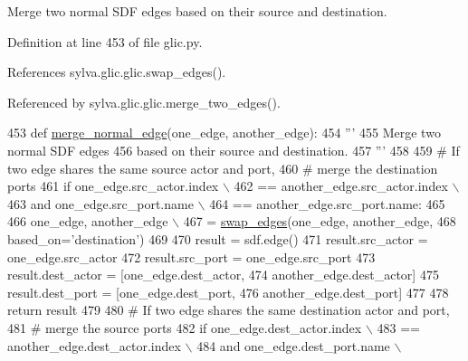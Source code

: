 \begin{DoxyVerb}  Merge two normal SDF edges
  based on their source and destination.
\end{DoxyVerb}
 

Definition at line 453 of file glic.\+py.



References sylva.\+glic.\+glic.\+swap\+\_\+edges().



Referenced by sylva.\+glic.\+glic.\+merge\+\_\+two\+\_\+edges().


\begin{DoxyCode}
453     \textcolor{keyword}{def }\hyperlink{namespacesylva_1_1glic_1_1glic_a1d03fa1322fc331579ff650ea5612ce8}{merge\_normal\_edge}(one\_edge, another\_edge):
454         \textcolor{stringliteral}{'''}
455 \textcolor{stringliteral}{          Merge two normal SDF edges}
456 \textcolor{stringliteral}{          based on their source and destination.}
457 \textcolor{stringliteral}{        '''}
458 
459         \textcolor{comment}{# If two edge shares the same source actor and port,}
460         \textcolor{comment}{# merge the destination ports}
461         \textcolor{keywordflow}{if} one\_edge.src\_actor.index \(\backslash\)
462                 == another\_edge.src\_actor.index \(\backslash\)
463                 \textcolor{keywordflow}{and} one\_edge.src\_port.name \(\backslash\)
464                 == another\_edge.src\_port.name:
465 
466             one\_edge, another\_edge \(\backslash\)
467                 = \hyperlink{namespacesylva_1_1glic_1_1glic_aa33f0fa18db2dc181313352cfdbc0cca}{swap\_edges}(one\_edge, another\_edge,
468                              based\_on=\textcolor{stringliteral}{'destination'})
469 
470             result = sdf.edge()
471             result.src\_actor = one\_edge.src\_actor
472             result.src\_port = one\_edge.src\_port
473             result.dest\_actor = [one\_edge.dest\_actor,
474                                  another\_edge.dest\_actor]
475             result.dest\_port = [one\_edge.dest\_port,
476                                 another\_edge.dest\_port]
477 
478             \textcolor{keywordflow}{return} result
479 
480         \textcolor{comment}{# If two edge shares the same destination actor and port,}
481         \textcolor{comment}{# merge the source ports}
482         \textcolor{keywordflow}{if} one\_edge.dest\_actor.index \(\backslash\)
483                 == another\_edge.dest\_actor.index \(\backslash\)
484                 \textcolor{keywordflow}{and} one\_edge.dest\_port.name \(\backslash\)

\end{DoxyCode}
